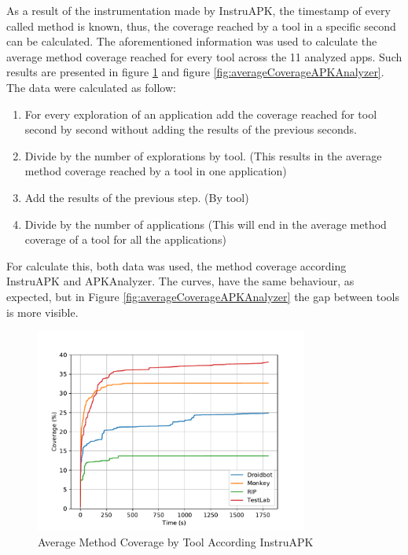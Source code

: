 As a result of the instrumentation made by InstruAPK, the timestamp of every called method is known, thus, the coverage reached by a tool in a specific second can be calculated. The aforementioned information was used to calculate the average method coverage reached for every tool across the 11 analyzed apps. Such results are presented in figure \ref{fig:averageCoverageInstruAPK} and figure \ref{fig:averageCoverageAPKAnalyzer}. The data were calculated as follow:  

\begin{enumerate}
\item For every exploration of an application add the coverage reached for tool second by second without adding the results of the previous seconds.
\item Divide by the number of explorations by tool. (This results in the average method coverage reached by a tool in one application)
\item Add the results of the previous step. (By tool)
\item Divide by the number of applications (This will end in the average method coverage of a tool for all the applications)
\end{enumerate} 

For calculate this, both data was used, the method coverage according InstruAPK and APKAnalyzer. The curves, have the same behaviour, as expected, but in Figure \ref{fig:averageCoverageAPKAnalyzer} the gap between tools is more visible.

\begin{figure}[h]
\centering
\includegraphics[width=0.8\textwidth]{../Figures/averageCoverageInstruAPK.pdf}
\caption{Average Method Coverage by Tool According InstruAPK}\label{fig:averageCoverageInstruAPK}
\end{figure}

